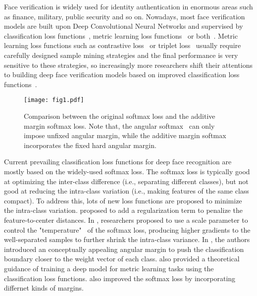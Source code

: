 \documentclass[10pt,twocolumn,letterpaper]{article}
\begin{document}
Face verification is widely used for identity authentication in enormous areas such as finance, military, public security and so on. Nowadays, most face verification models are built upon Deep Convolutional Neural Networks and supervised by classification loss functions~\cite{taigman2014deepface, wen2016discriminative,wang2017normface,liu2017sphereface}, metric learning loss functions~\cite{schroff2015facenet} or both~\cite{sun2014deep,parkhi2015deep}. Metric learning loss functions such as contrastive loss~\cite{sun2014deep} or triplet loss~\cite{schroff2015facenet} usually require carefully designed sample mining strategies and the final performance is very sensitive to these strategies, so increasingly more researchers shift their attentions to building deep face verification models based on improved classification loss functions~\cite{wen2016discriminative, wang2017normface, liu2017sphereface}.

\begin{figure}
	\centering
	\texttt{[image: fig1.pdf]}
	\caption{Comparison between the original softmax loss and the additive margin softmax loss. Note that, the angular softmax~\cite{liu2017sphereface} can only impose unfixed angular margin, while the additive margin softmax incorporates the fixed hard angular margin.}
	\label{fig:comparison}
	\vspace{-5mm}
\end{figure}

Current prevailing classification loss functions for deep face recognition are mostly based on the widely-used softmax loss. The softmax loss is typically good at optimizing the inter-class difference (i.e., separating different classes), but not good at reducing the intra-class variation (i.e., making features of the same class compact). To address this, lots of new loss functions are proposed to minimize the intra-class variation. \cite{wen2016discriminative} proposed to add a regularization term to penalize the feature-to-center distances. In \cite{wang2017normface,liu_2017_coco_v2,ranjan2017l2}, researchers proposed to use a scale parameter to control the "temperature"~\cite{hinton2015distilling} of the softmax loss, producing higher gradients to the well-separated samples to further shrink the intra-class variance. In \cite{liu2017sphereface,liu2016large}, the authors introduced an conceptually appealing angular margin to push the classification boundary closer to the weight vector of each class. \cite{liu2017sphereface} also provided a theoretical guidance of training a deep model for metric learning tasks using the classification loss functions. \cite{liang2017soft,liu_2017_coco_v2,ranjan2017l2} also improved the softmax loss by incorporating differnet kinds of margins. 
\end{document}
